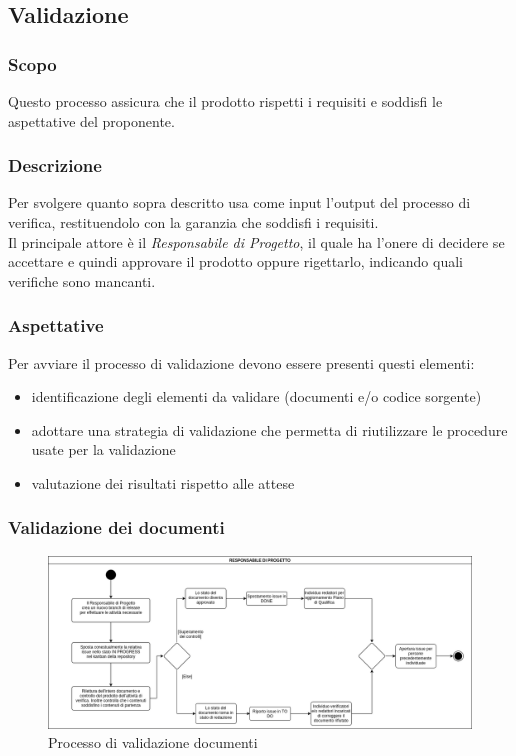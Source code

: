 \subsection{Validazione}
\subsubsection{Scopo}
Questo processo assicura che il prodotto rispetti i requisiti e soddisfi le aspettative del proponente.

\subsubsection{Descrizione}
Per svolgere quanto sopra descritto usa come input l'output del processo di verifica,
restituendolo con la garanzia che soddisfi i requisiti.\\
Il principale attore è il \textit{Responsabile di Progetto}, il quale ha l'onere di decidere
se accettare e quindi approvare il prodotto oppure rigettarlo, indicando quali verifiche sono mancanti.

\subsubsection{Aspettative}
Per avviare il processo di validazione devono essere presenti questi elementi:
\begin{itemize}
    \item identificazione degli elementi da validare (documenti e/o codice sorgente)
    \item adottare una strategia di validazione che permetta di riutilizzare le procedure usate
    per la validazione
    \item valutazione dei risultati rispetto alle attese
\end{itemize}

\subsubsection{Validazione dei documenti}
\begin{figure}[h!]
    \includegraphics[width=\linewidth]{res/images/processo_validazione.png}
    \caption{Processo di validazione documenti}
\end{figure}

